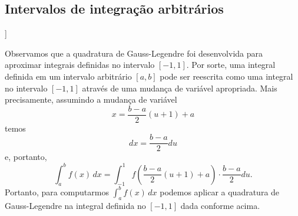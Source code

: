 \begin{ex}





\end{ex}

\subsection{Intervalos de integração arbitrários}

\begin{flushleft}
  [[tag:revisar]]
\end{flushleft}

Observamos que a quadratura de Gauss-Legendre foi desenvolvida para aproximar integrais definidas no intervalo $[-1, 1]$. Por sorte, uma integral definida em um intervalo arbitrário $[a, b]$ pode ser reescrita como uma integral no intervalo $[-1, 1]$ através de uma mudança de variável apropriada. Mais precisamente, assumindo a mudança de variável
\begin{equation}
  x = \frac{b-a}{2}(u+1)+a
\end{equation}
temos
\begin{equation}
  dx = \frac{b-a}{2}du
\end{equation}
e, portanto,
\begin{equation}
  \int_a^b f(x)\,dx = \int_{-1}^1 f\left(\frac{b-a}{2}(u+1)+a\right)\cdot \frac{b-a}{2}du.
\end{equation}
Portanto, para computarmos $\int_a^bf(x)\,dx$ podemos aplicar a quadratura de Gauss-Legendre na integral definida no $[-1, 1]$ dada conforme acima.

